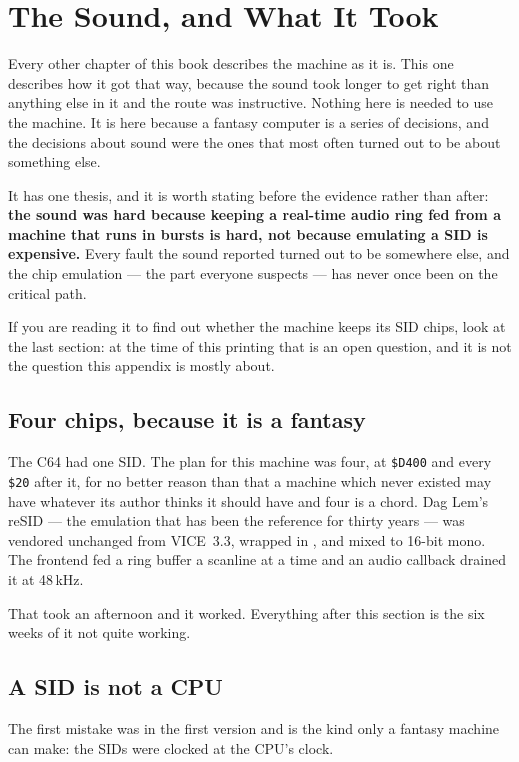 \chapter{The Sound, and What It Took}\label{cha:sound}

Every other chapter of this book describes the machine as it is. This
one describes how it got that way, because the sound took longer to get
right than anything else in it and the route was instructive. Nothing
here is needed to use the machine. It is here because a fantasy computer
is a series of decisions, and the decisions about sound were the ones
that most often turned out to be about something else.

It has one thesis, and it is worth stating before the evidence rather
than after: \textbf{the sound was hard because keeping a real-time audio
ring fed from a machine that runs in bursts is hard, not because
emulating a SID is expensive.} Every fault the sound reported turned out
to be somewhere else, and the chip emulation --- the part everyone
suspects --- has never once been on the critical path.

If you are reading it to find out whether the machine keeps its SID
chips, look at the last section: at the time of this printing that is an
open question, and it is not the question this appendix is mostly
about.

\section{Four chips, because it is a fantasy}
The C64 had one SID. The plan for this machine was four, at
\texttt{\$D400} and every \texttt{\$20} after it, for no better reason
than that a machine which never existed may have whatever its author
thinks it should have and four is a chord. Dag Lem's reSID --- the
emulation that has been the reference for thirty years --- was vendored
unchanged from VICE~3.3, wrapped in , and mixed to
16-bit mono. The frontend fed a ring buffer a scanline at a time and an
audio callback drained it at 48\,kHz.

That took an afternoon and it worked. Everything after this section is
the six weeks of it not quite working.

\section{A SID is not a CPU}
The first mistake was in the first version and is the kind only a
fantasy machine can make: the SIDs were clocked at the CPU's clock.


